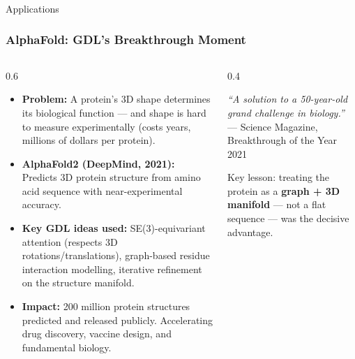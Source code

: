 \begin{frame}[fragile]\frametitle{}
\begin{center}
{\Large Applications}
\end{center}
\end{frame}

\begin{frame}[fragile]\frametitle{AlphaFold: GDL's Breakthrough Moment}

\begin{columns}
\begin{column}{0.6\textwidth}
\begin{itemize}
  \item \textbf{Problem:} A protein's 3D shape determines its biological function --- and shape is hard to measure experimentally (costs years, millions of dollars per protein).
  \item \textbf{AlphaFold2 (DeepMind, 2021):} Predicts 3D protein structure from amino acid sequence with near-experimental accuracy.
  \item \textbf{Key GDL ideas used:} SE(3)-equivariant attention (respects 3D rotations/translations), graph-based residue interaction modelling, iterative refinement on the structure manifold.
  \item \textbf{Impact:} 200 million protein structures predicted and released publicly. Accelerating drug discovery, vaccine design, and fundamental biology.
\end{itemize}
\end{column}
\begin{column}{0.4\textwidth}
\begin{block}{}
\centering
{\em ``A solution to a 50-year-old grand challenge in biology.''}\\
\vspace{0.2cm}
{\small --- Science Magazine, Breakthrough of the Year 2021}
\end{block}
\vspace{0.3cm}
{\small Key lesson: treating the protein as a \textbf{graph + 3D manifold} --- not a flat sequence --- was the decisive advantage.}
\end{column}
\end{columns}

\end{frame}

